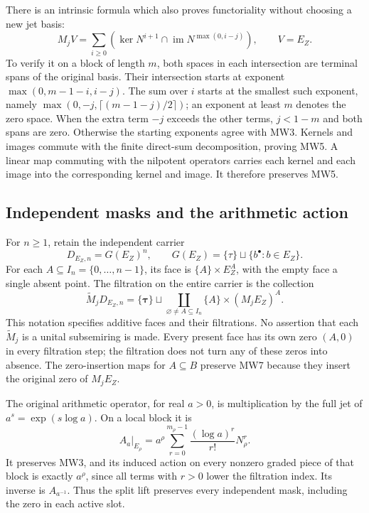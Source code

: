 There is an intrinsic formula which also proves functoriality without
choosing a new jet basis:
\[
 M_jV=\sum_{i\geq0}
       \left(\ker N^{i+1}\cap
                    \operatorname{im}N^{\max(0,i-j)}\right),
 \qquad V=E_Z .
 \tag{MW5}
\]
To verify it on a block of length \(m\), both spaces in each intersection
are terminal spans of the original basis. Their intersection starts at
exponent \(\max(0,m-1-i,i-j)\). The sum over \(i\) starts at the smallest
such exponent, namely
\(\max(0,-j,\lceil(m-1-j)/2\rceil)\); an exponent at least \(m\) denotes the
zero space. When the extra term \(-j\) exceeds the other terms,
\(j<1-m\) and both spans are zero. Otherwise the starting exponents
agree with MW3. Kernels and images commute with the
finite direct-sum decomposition, proving MW5. A linear map commuting
with the nilpotent operators carries each kernel and each image into
the corresponding kernel and image. It therefore preserves MW5.

\subsection{Independent masks and the arithmetic action}

For \(n\geq1\), retain the independent carrier
\[
 D_{E_Z,n}=G(E_Z)^n,\qquad
 G(E_Z)=\{\tau\}\sqcup\{b^\bullet:b\in E_Z\}.
 \tag{MW6}
\]
For each \(A\subseteq I_n=\{0,\ldots,n-1\}\), its face is
\(\{A\}\times E_Z^A\), with the empty face a single absent point.
The filtration on the entire carrier is the collection
\[
 \widetilde M_jD_{E_Z,n}
   =\{\boldsymbol\tau\}\sqcup
     \coprod_{\varnothing\ne A\subseteq I_n}
           \{A\}\times(M_jE_Z)^A .
 \tag{MW7}
\]
This notation specifies additive faces and their filtrations. No assertion
that each \(\widetilde M_j\) is a unital subsemiring is made.
Every present face has its own zero \((A,0)\) in every filtration step;
the filtration does not turn any of these zeros into absence.
The zero-insertion maps for \(A\subseteq B\) preserve MW7 because they
insert the original zero of \(M_jE_Z\).

The original arithmetic operator, for real \(a>0\), is multiplication by
the full jet of \(a^s=\exp(s\log a)\). On a local block it is
\[
 A_a|_{E_\rho}
 =a^\rho\sum_{r=0}^{m_\rho-1}
       \frac{(\log a)^r}{r!}N_\rho^r .
 \tag{MW8}
\]
It preserves MW3, and its induced action on every nonzero graded
piece of that block is exactly \(a^\rho\), since all terms with
\(r>0\) lower the filtration index. Its inverse is \(A_{a^{-1}}\).
Thus the split lift preserves every independent mask, including
the zero in each active slot.

